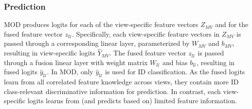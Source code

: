 \subsubsection{Prediction}
MOD produces logits for each of the view-specific feature vectors $Z_{MV}$ and for the fused feature vector $z_{\mathcal{U}}$. Specifically, each view-specific feature vectors in $Z_{MV}$ is passed through a corresponding linear layer, parameterized by $W_{MV}$ and $b_{MV}$, resulting in view-specific logits $\hat{Y}_{MV}$. The fused feature vector $z_{\mathcal{U}}$ is passed through a fusion linear layer with weight matrix $W_{\mathcal{U}}$ and bias $b_{\mathcal{U}}$, resulting in fused logits $\hat{y}_{\mathcal{U}}$. In MOD, only $\hat{y}_{\mathcal{U}}$ is used for ID classification. As the fused logits learn from all correlated feature knowledge across views, they contain more ID class-relevant discriminative information for prediction. In contrast, each view-specific logits learns from (and predicts based on) limited feature information.

%
